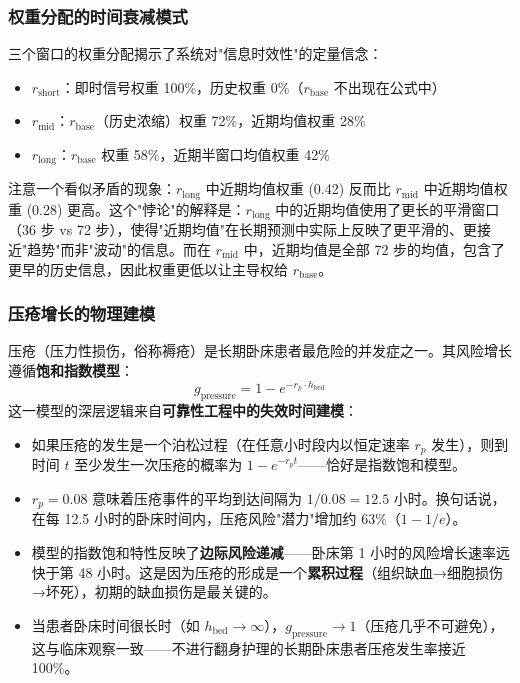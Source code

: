 \documentclass[11pt,a4paper]{ctexart}
\theoremstyle{remark}
\begin{document}
\subsubsection{权重分配的时间衰减模式}

三个窗口的权重分配揭示了系统对"信息时效性"的定量信念：
\begin{itemize}[nosep]
\item $r_{\text{short}}$：即时信号权重 100\%，历史权重 0\%（$r_{\text{base}}$ 不出现在公式中）
\item $r_{\text{mid}}$：$r_{\text{base}}$（历史浓缩）权重 72\%，近期均值权重 28\%
\item $r_{\text{long}}$：$r_{\text{base}}$ 权重 58\%，近期半窗口均值权重 42\%
\end{itemize}
注意一个看似矛盾的现象：$r_{\text{long}}$ 中近期均值权重 (0.42) 反而比 $r_{\text{mid}}$ 中近期均值权重 (0.28) 更高。这个"悖论"的解释是：$r_{\text{long}}$ 中的近期均值使用了更长的平滑窗口（36 步 vs 72 步），使得"近期均值"在长期预测中实际上反映了更平滑的、更接近"趋势"而非"波动"的信息。而在 $r_{\text{mid}}$ 中，近期均值是全部 72 步的均值，包含了更早的历史信息，因此权重更低以让主导权给 $r_{\text{base}}$。

\subsubsection{压疮增长的物理建模}

压疮（压力性损伤，俗称褥疮）是长期卧床患者最危险的并发症之一。其风险增长遵循\textbf{饱和指数模型}：
\[
g_{\text{pressure}} = 1 - e^{-r_p \cdot h_{\text{bed}}}
\]
这一模型的深层逻辑来自\textbf{可靠性工程中的失效时间建模}：
\begin{itemize}[nosep]
\item 如果压疮的发生是一个泊松过程（在任意小时段内以恒定速率 $r_p$ 发生），则到时间 $t$ 至少发生一次压疮的概率为 $1 - e^{-r_p t}$——恰好是指数饱和模型。
\item $r_p = 0.08$ 意味着压疮事件的平均到达间隔为 $1/0.08 = 12.5$ 小时。换句话说，在每 12.5 小时的卧床时间内，压疮风险"潜力"增加约 63\%（$1 - 1/e$）。
\item 模型的指数饱和特性反映了\textbf{边际风险递减}——卧床第 1 小时的风险增长速率远快于第 48 小时。这是因为压疮的形成是一个\textbf{累积过程}（组织缺血→细胞损伤→坏死），初期的缺血损伤是最关键的。
\item 当患者卧床时间很长时（如 $h_{\text{bed}} \to \infty$），$g_{\text{pressure}} \to 1$（压疮几乎不可避免），这与临床观察一致——不进行翻身护理的长期卧床患者压疮发生率接近 100\%。
\end{itemize}
\end{document}
